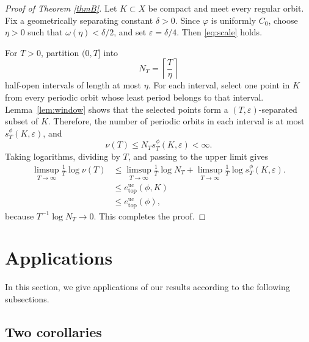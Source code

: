 \documentclass[11pt,reqno]{amsart}
\theoremstyle{definition}
\theoremstyle{remark}
\newcommand{\hE}{e^{\mathrm{uc}}_{\mathrm{top}}}
\begin{document}
\begin{proof}[Proof of Theorem \ref{thmB}]
Let $K\subset X$ be compact and meet every regular orbit.  Fix a
geometrically separating constant $\delta>0$.  Since $\varphi$ is uniformly $C_0$, choose
$\eta>0$ such that $\omega(\eta)<\delta/2$, and set
$\varepsilon=\delta/4$.  Then \eqref{eq:scale} holds.

For $T>0$, partition $(0,T]$ into
\[
 N_T=\left\lceil\frac{T}{\eta}\right\rceil
\]
half-open intervals of length at most $\eta$.  For each interval, select one
point in $K$ from every periodic orbit whose least period belongs to that
interval.  Lemma~\ref{lem:window} shows that the selected points form a
$(T,\varepsilon)$-separated subset of $K$.  Therefore, the number of periodic
orbits in each interval is at most $s_T^\phi(K,\varepsilon)$, and
\begin{equation}\label{eq:count}
 \nu(T)\le N_T s_T^\phi(K,\varepsilon)<\infty.
\end{equation}
Taking logarithms, dividing by $T$, and passing to the upper limit gives
\begin{align*}
 \limsup_{T\to\infty}\frac1T\log\nu(T)
 &\le \limsup_{T\to\infty}\frac1T\log N_T
      +\limsup_{T\to\infty}\frac1T\log s_T^\phi(K,\varepsilon).\\
 &\le \hE(\phi,K)\\
& \le \hE(\phi),
\end{align*}
because $T^{-1}\log N_T\to0$.  This completes the proof.
\end{proof}















\section{Applications}
\label{sec8}







\noindent
In this section, we give applications of our results according to the following subsections.


\subsection{Two corollaries}
\end{document}
